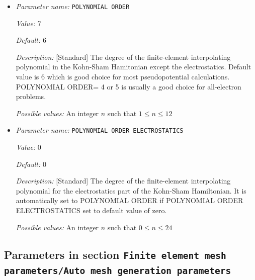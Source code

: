 \begin{itemize}
\item {\it Parameter name:} {\tt POLYNOMIAL ORDER}
\label{parameters:Finite element mesh parameters/POLYNOMIAL ORDER}
\label{parameters:Finite_20element_20mesh_20parameters/POLYNOMIAL_20ORDER}


{\it Value:} 7


{\it Default:} 6


{\it Description:} [Standard] The degree of the finite-element interpolating polynomial in the Kohn-Sham Hamitonian except the electrostatics. Default value is 6 which is good choice for most pseudopotential calculations. POLYNOMIAL ORDER= 4 or 5 is usually a good choice for all-electron problems.


{\it Possible values:} An integer $n$ such that $1\leq n \leq 12$
\item {\it Parameter name:} {\tt POLYNOMIAL ORDER ELECTROSTATICS}
\label{parameters:Finite element mesh parameters/POLYNOMIAL ORDER ELECTROSTATICS}
\label{parameters:Finite_20element_20mesh_20parameters/POLYNOMIAL_20ORDER_20ELECTROSTATICS}


{\it Value:} 0


{\it Default:} 0


{\it Description:} [Standard] The degree of the finite-element interpolating polynomial for the electrostatics part of the Kohn-Sham Hamiltonian. It is automatically set to POLYNOMIAL ORDER if POLYNOMIAL ORDER ELECTROSTATICS set to default value of zero.


{\it Possible values:} An integer $n$ such that $0\leq n \leq 24$
\end{itemize}



\subsection{Parameters in section \tt Finite element mesh parameters/Auto mesh generation parameters}
\label{parameters:Finite_20element_20mesh_20parameters/Auto_20mesh_20generation_20parameters}

